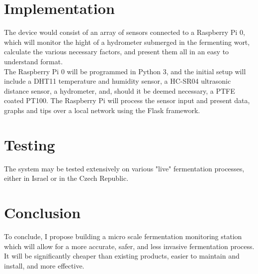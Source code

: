 \documentclass[]{article}
\begin{document}
\section{Implementation}
The device would consist of an array of sensors connected to a Raspberry Pi 0, which will monitor the hight of a hydrometer submerged in the fermenting wort, calculate the various necessary factors, and present them all in an easy to understand format.\\
The Raspberry Pi 0 will be programmed in Python 3, and the initial setup will include a DHT11 temperature and humidity sensor, a HC-SR04 ultrasonic distance sensor, a hydrometer, and, should it be deemed necessary, a PTFE coated PT100. The Raspberry Pi will process the sensor input and present data, graphs and tips over a local network using the Flask framework.

\section{Testing}
The system may be tested extensively on various "live" fermentation processes, either in Israel or in the Czech Republic.


\section{Conclusion}
To conclude, I propose building a micro scale fermentation monitoring station which will allow for a more accurate, safer, and less invasive fermentation process.\\
It will be significantly cheaper than existing products, easier to maintain and install, and more effective.
\end{document}
